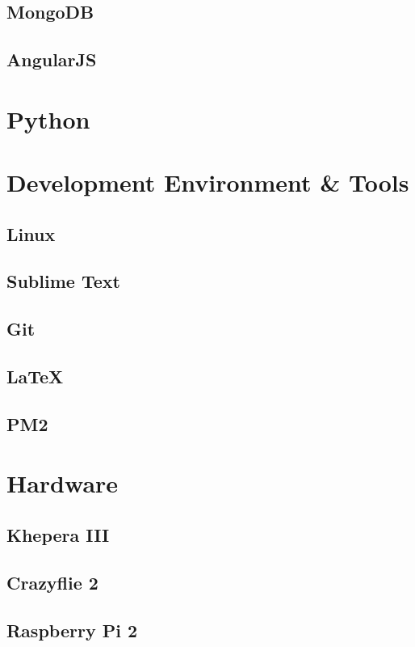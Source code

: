 \subsection{MongoDB}
\subsection{AngularJS} \label{AngularJS}
\section{Python}
\section{Development Environment \& Tools}
\subsection{Linux}
\subsection{Sublime Text}
\subsection{Git}
\subsection{\LaTeX}
\subsection{PM2}
\section{Hardware}
\subsection{Khepera III}
\subsection{Crazyflie 2}
\subsection{Raspberry Pi 2}
